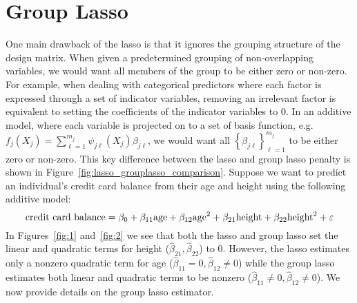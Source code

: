 \section{Group Lasso}

One main drawback of the lasso is that it ignores the grouping structure of the design matrix. When given a predetermined grouping of non-overlapping variables, we would want all members of the group to be either zero or non-zero. For example, when dealing with categorical predictors where each factor is expressed through a set of indicator variables, removing an irrelevant factor is equivalent to setting the coefficients of the indicator variables to 0. In an additive model, where each variable is projected on to a set of basis function, e.g. $f_j(X_j) = \sum_{\ell = 1}^{m_j} \psi_{j\ell}(X_j) \beta_{j\ell}$, we would want all $\left\lbrace \beta_{j\ell}\right\rbrace_{\ell=1}^{m_j}$ to be either zero or non-zero. This key difference between the lasso and group lasso penalty is shown in Figure~\ref{fig:lasso_grouplasso_comparison}. 
Suppose we want to predict an individual's credit card balance from their age and height using the following additive model:
\begin{equation}
\textrm{{credit card balance}} = \beta_0 + \beta_{11}\textrm{{age}} + \beta_{12}\textrm{{age}}^2 + \beta_{21}\textrm{{height}} + \beta_{22}\textrm{{height}}^2 + \varepsilon \label{eq:credit_card}
\end{equation}  
In Figures~\ref{fig:1} and~\ref{fig:2} we see that both the lasso and group lasso set the linear and quadratic terms for height ($\hat\beta_{21},\hat\beta_{22}$) to 0. However, the lasso estimates only a nonzero quadratic term for age ($\hat\beta_{11}=0, \hat\beta_{12}\neq 0$) while the group lasso estimates both linear and quadratic terms to be nonzero ($\hat\beta_{11}\neq 0, \hat\beta_{12}\neq 0$). We now provide details on the group lasso estimator.



